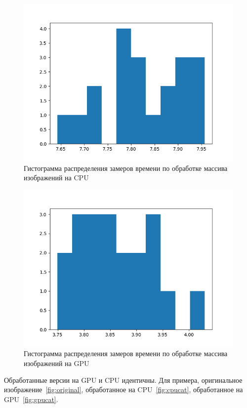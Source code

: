 \begin{figure}[H]
    \centering
    \includegraphics[width=\textwidth]{figures/CPU.png}
    \caption{Гистограмма распределения замеров времени по обработке массива изображений на CPU}
    \label{fig:cpu}
\end{figure}

\begin{figure}[H]
    \centering
    \includegraphics[width=\textwidth]{figures/GPU.png}
    \caption{Гистограмма распределения замеров времени по обработке массива изображений на GPU}
    \label{fig:gpu}
\end{figure}

Обработанные версии на GPU и CPU идентичны. Для примера, оригинальное изображение~\ref{fig:original}, обработанное на CPU~\ref{fig:cpucat}, обработанное на GPU~\ref{fig:gpucat}.

